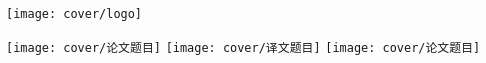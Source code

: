 


\thispagestyle{empty}

\begin{center}
\texttt{[image: cover/logo]}
\par

\vspace{10mm}
\songti{}
\par

\ifzjutTranslation
	\vspace{5mm}
	\songti{}
	\par
\fi

\ifzjutLiteratureReview
	\vspace{5mm}
	\songti{}
	\par
\fi

\ifzjutOpeningReport
	\vspace{5mm}
	\songti{}
	\par
\fi



\ifzjutThesis
	\vspace{16mm}
	\texttt{[image: cover/论文题目]}
	\newcommand{\myarraystretch}{.75}
	\vspace{25mm}
\else
	\ifzjutTranslation
		\vspace{10mm}
		\texttt{[image: cover/译文题目]}
		\newcommand{\myarraystretch}{.6}
		\vspace{15mm}
	\else
		\vspace{10mm}
		\texttt{[image: cover/论文题目]}
		\newcommand{\myarraystretch}{.6}
		\vspace{15mm}
	\fi
\fi


\end{center}
